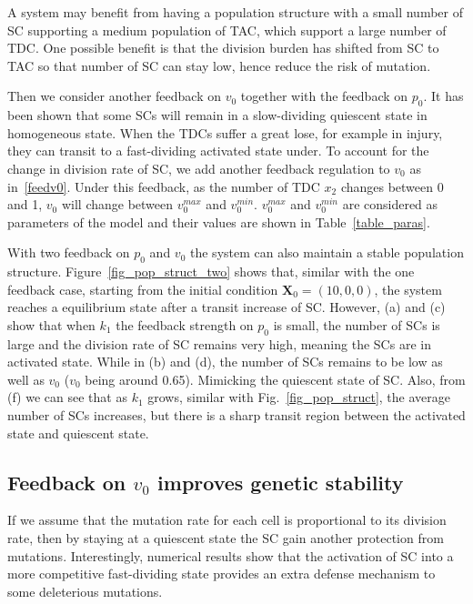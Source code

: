 \documentclass[12pt]{article}
\begin{document}
A system may benefit from having a 
population structure with a small number of
SC supporting a medium population of TAC, which support 
a large number of TDC. One possible benefit
is that the division burden has shifted from
SC to TAC so that number of SC can stay low,
hence reduce the risk of mutation.

Then we consider another feedback on $v_0$ together
with the feedback on $p_0$.
It has been shown that some SCs will remain in 
a slow-dividing quiescent state in homogeneous state.
When the TDCs suffer a great lose, 
for example in injury, they can transit 
to a fast-dividing activated state under. 
To account for the change in division rate of SC,
we add another feedback regulation to $v_0$ as in~\eqref{feedv0}.
Under this feedback, as the number of TDC $x_2$ changes between 0 and 1, 
$v_0$ will change between $v_0^{max}$ and $v_0^{min}$.
$v_0^{max}$ and $v_0^{min}$ are considered as parameters 
of the model and their values are shown in Table~\ref{table_paras}.

With two feedback on $p_0$ and $v_0$
the system can also maintain a stable population structure.
Figure~\ref{fig_pop_struct_two} shows that, 
similar with the one feedback case,
starting from the initial condition $\mathbf{X}_0 = (10, 0, 0)$,
the system reaches a equilibrium state after a transit increase of
SC. However, (a) and (c) show that when $k_1$ the feedback strength
on $p_0$ is small, the number of SCs is large and the division 
rate of SC remains very high, meaning the SCs are in activated state. 
While in (b) and (d), the number of SCs remains to be low as well as
$v_0$ ($v_0$ being around 0.65). Mimicking the quiescent state of SC.
Also, from (f) we can see that as $k_1$ grows, similar
with Fig.~\ref{fig_pop_struct}, the average number of 
SCs increases, but there is a sharp transit region between
the activated state and quiescent state.

\subsection*{Feedback on $v_0$ improves genetic stability}
If we assume that the mutation rate for each cell is 
proportional to its division rate, then by staying at
a quiescent state the SC gain another protection from
mutations. Interestingly, numerical results 
show that the activation of SC into a more competitive
fast-dividing state provides an extra defense mechanism 
to some deleterious mutations.
\end{document}
